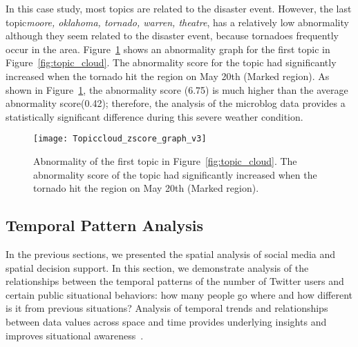 In this case study, most topics are related to the disaster event. 
However, the last topic\textemdash \textit{moore, oklahoma, tornado, warren, theatre}, has a relatively low abnormality although they seem related to the disaster event, because tornadoes frequently occur in the area.
Figure~\ref{fig:abnormality_graph} shows an abnormality graph for the first topic in Figure~\ref{fig:topic_cloud}.
The abnormality score for the topic had significantly increased when the tornado hit the region on May
20th (Marked region). As shown in Figure~\ref{fig:abnormality_graph}, the abnormality score (6.75) is much higher than the average abnormality score(0.42); therefore, the analysis of the microblog data provides a statistically significant difference during this severe weather condition.



\begin{figure}[tb]
\centering
\texttt{[image: Topiccloud\_zscore\_graph\_v3]}
\caption{Abnormality of the first topic in Figure~\ref{fig:topic_cloud}. 
The abnormality score of the topic had significantly increased when the tornado hit the region on May 20th (Marked region).}
\label{fig:abnormality_graph}
\end{figure}


\subsection{Temporal Pattern Analysis}
\label{sec:temporal_pattern}
%
In the previous sections, we presented the spatial analysis of social media and spatial decision support. 
In this section, we demonstrate analysis of the relationships between the temporal patterns of the number of Twitter users and certain public situational behaviors:
how many people go where and how different is it from previous situations?
Analysis of temporal trends and relationships between data values across space and time provides underlying insights and improves situational awareness~\cite{Maciejewski:2010:FHP, Malik:2011:DTC}.



